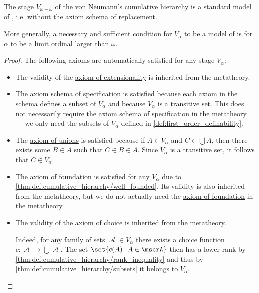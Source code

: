 \begin{theorem}[Model of Z]\label{thm:cumulative_hierarchy_model_of_z}
  The stage \( V_{\omega + \omega} \) of the \hyperref[def:cumulative_hierarchy]{von Neumann's cumulative hierarchy} is a standard model of , i.e.  without the \hyperref[def:zfc/replacement]{axiom schema of replacement}.

  More generally, a necessary and sufficient condition for \( V_\alpha \) to be a model of  is for \( \alpha \) to be a limit ordinal larger than \( \omega \).
\end{theorem}
\begin{proof}
  The following axioms are automatically satisfied for any stage \( V_\alpha \):
  \begin{itemize}
    \item The validity of the \hyperref[def:zfc/extensionality]{axiom of extensionality} is inherited from the metatheory.

    \item The \hyperref[def:zfc/specification]{axiom schema of specification} is satisfied because each axiom in the schema \hyperref[def:first_order_definability]{defines} a subset of \( V_\alpha \) and because \( V_\alpha \) is a transitive set. This does not necessarily require the axiom schema of specification in the metatheory --- we only need the subsets of \( V_\alpha \) defined in \cref{def:first_order_definability}.

    \item The \hyperref[def:zfc/union]{axiom of unions} is satisfied because if \( A \in V_\alpha \) and \( C \in \bigcup A \), then there exists some \( B \in A \) such that \( C \in B \in A \). Since \( V_\alpha \) is a transitive set, it follows that \( C \in V_\alpha \).

    \item The \hyperref[def:zfc/foundation]{axiom of foundation} is satisfied for any \( V_\alpha \) due to \cref{thm:def:cumulative_hierarchy/well_founded}. Its validity is also inherited from the metatheory, but we do not actually need the \hyperref[def:zfc/foundation]{axiom of foundation} in the metatheory.

    \item The validity of the \hyperref[def:zfc/choice]{axiom of choice} is inherited from the metatheory.

    Indeed, for any family of sets \( \mscrA \in V_\alpha \) there exists a \hyperref[def:choice_function]{choice function} \( c: \mscrA \to \bigcup \mscrA \). The set \( \set{ c(A) \given A \in \mscrA } \) then has a lower rank by \cref{thm:def:cumulative_hierarchy/rank_inequality} and thus by \cref{thm:def:cumulative_hierarchy/subsets} it belongs to \( V_\alpha \).
  \end{itemize}


\end{proof}

